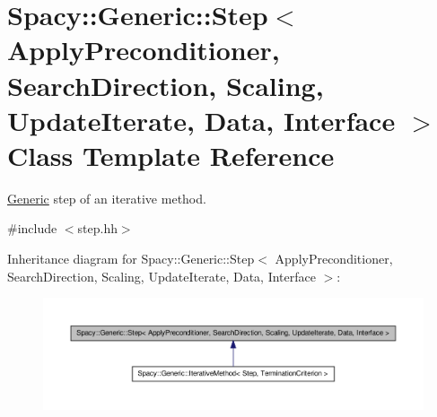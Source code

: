 \hypertarget{classSpacy_1_1Generic_1_1Step}{\section{\-Spacy\-:\-:\-Generic\-:\-:\-Step$<$ \-Apply\-Preconditioner, \-Search\-Direction, \-Scaling, \-Update\-Iterate, \-Data, \-Interface $>$ \-Class \-Template \-Reference}
\label{classSpacy_1_1Generic_1_1Step}
}


\hyperlink{namespaceSpacy_1_1Generic}{\-Generic} step of an iterative method.  




{\ttfamily \#include $<$step.\-hh$>$}



\-Inheritance diagram for \-Spacy\-:\-:\-Generic\-:\-:\-Step$<$ \-Apply\-Preconditioner, \-Search\-Direction, \-Scaling, \-Update\-Iterate, \-Data, \-Interface $>$\-:
\nopagebreak
\begin{figure}[H]
\begin{center}
\leavevmode
\includegraphics[width=350pt]{classSpacy_1_1Generic_1_1Step__inherit__graph}
\end{center}
\end{figure}
